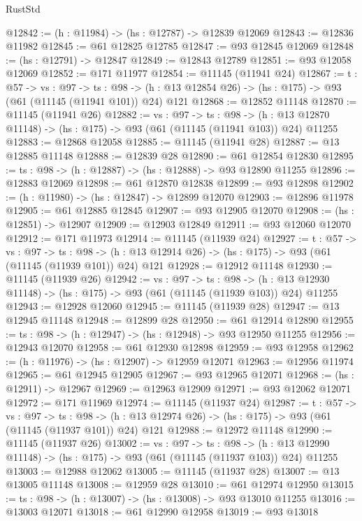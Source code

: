 \begin{lexlean}{RustStd}
\begin{coremodule}
@12842 := (h : @11984) -> (hs : @12787) -> @12839 @12069
@12843 := @12836 @11982
@12845 := @61 @12825 @12785
@12847 := @93 @12845 @12069
@12848 := (hs : @12791) -> @12847
@12849 := @12843 @12789
@12851 := @93 @12058 @12069
@12852 := @171 @11977
@12854 := @11145 (@11941 @24)
@12867 := {t : @57} ->
  {vs : @97} ->
  {ts : @98} -> (h : @13 @12854 @26) -> (hs : @175) -> @93 (@61 (@11145 (@11941 @101)) @24) @121
@12868 := @12852 @11148
@12870 := @11145 (@11941 @26)
@12882 := {vs : @97} ->
  {ts : @98} ->
  (h : @13 @12870 @11148) -> (hs : @175) -> @93 (@61 (@11145 (@11941 @103)) @24) @11255
@12883 := @12868 @12058
@12885 := @11145 (@11941 @28)
@12887 := @13 @12885 @11148
@12888 := @12839 @28
@12890 := @61 @12854 @12830
@12895 := {ts : @98} -> (h : @12887) -> (hs : @12888) -> @93 @12890 @11255
@12896 := @12883 @12069
@12898 := @61 @12870 @12838
@12899 := @93 @12898
@12902 := (h : @11980) -> (hs : @12847) -> @12899 @12070
@12903 := @12896 @11978
@12905 := @61 @12885 @12845
@12907 := @93 @12905 @12070
@12908 := (hs : @12851) -> @12907
@12909 := @12903 @12849
@12911 := @93 @12060 @12070
@12912 := @171 @11973
@12914 := @11145 (@11939 @24)
@12927 := {t : @57} ->
  {vs : @97} ->
  {ts : @98} -> (h : @13 @12914 @26) -> (hs : @175) -> @93 (@61 (@11145 (@11939 @101)) @24) @121
@12928 := @12912 @11148
@12930 := @11145 (@11939 @26)
@12942 := {vs : @97} ->
  {ts : @98} ->
  (h : @13 @12930 @11148) -> (hs : @175) -> @93 (@61 (@11145 (@11939 @103)) @24) @11255
@12943 := @12928 @12060
@12945 := @11145 (@11939 @28)
@12947 := @13 @12945 @11148
@12948 := @12899 @28
@12950 := @61 @12914 @12890
@12955 := {ts : @98} -> (h : @12947) -> (hs : @12948) -> @93 @12950 @11255
@12956 := @12943 @12070
@12958 := @61 @12930 @12898
@12959 := @93 @12958
@12962 := (h : @11976) -> (hs : @12907) -> @12959 @12071
@12963 := @12956 @11974
@12965 := @61 @12945 @12905
@12967 := @93 @12965 @12071
@12968 := (hs : @12911) -> @12967
@12969 := @12963 @12909
@12971 := @93 @12062 @12071
@12972 := @171 @11969
@12974 := @11145 (@11937 @24)
@12987 := {t : @57} ->
  {vs : @97} ->
  {ts : @98} -> (h : @13 @12974 @26) -> (hs : @175) -> @93 (@61 (@11145 (@11937 @101)) @24) @121
@12988 := @12972 @11148
@12990 := @11145 (@11937 @26)
@13002 := {vs : @97} ->
  {ts : @98} ->
  (h : @13 @12990 @11148) -> (hs : @175) -> @93 (@61 (@11145 (@11937 @103)) @24) @11255
@13003 := @12988 @12062
@13005 := @11145 (@11937 @28)
@13007 := @13 @13005 @11148
@13008 := @12959 @28
@13010 := @61 @12974 @12950
@13015 := {ts : @98} -> (h : @13007) -> (hs : @13008) -> @93 @13010 @11255
@13016 := @13003 @12071
@13018 := @61 @12990 @12958
@13019 := @93 @13018

\end{coremodule}
\end{lexlean}

